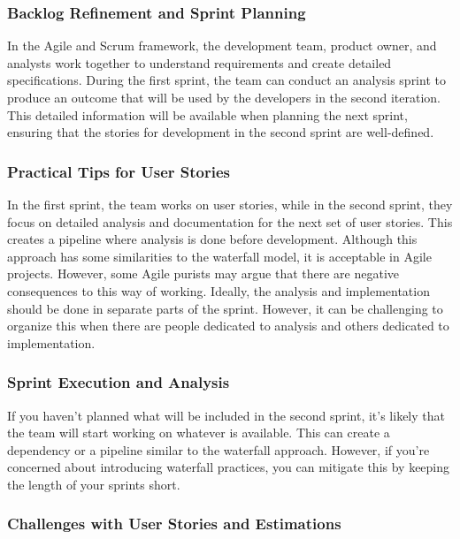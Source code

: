 \subsubsection{Backlog Refinement and Sprint Planning}

In the Agile and Scrum framework, the development team, product owner,
and analysts work together to understand requirements and create
detailed specifications. During the first sprint, the team can conduct
an analysis sprint to produce an outcome that will be used by the
developers in the second iteration. This detailed information will be
available when planning the next sprint, ensuring that the stories for
development in the second sprint are well-defined.

\subsubsection{Practical Tips for User Stories}

In the first sprint, the team works on user stories, while in the second
sprint, they focus on detailed analysis and documentation for the next
set of user stories. This creates a pipeline where analysis is done
before development. Although this approach has some similarities to the
waterfall model, it is acceptable in Agile projects. However, some Agile
purists may argue that there are negative consequences to this way of
working. Ideally, the analysis and implementation should be done in
separate parts of the sprint. However, it can be challenging to organize
this when there are people dedicated to analysis and others dedicated to
implementation.

\subsubsection{Sprint Execution and Analysis}

If you haven't planned what will be included in the second sprint, it's
likely that the team will start working on whatever is available. This
can create a dependency or a pipeline similar to the waterfall approach.
However, if you're concerned about introducing waterfall practices, you
can mitigate this by keeping the length of your sprints short.

\subsubsection{Challenges with User Stories and Estimations}


